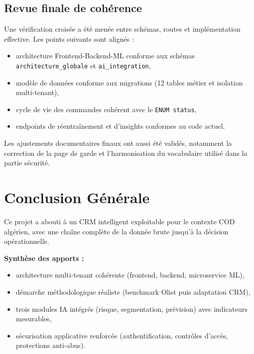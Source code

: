 \documentclass[12pt,a4paper]{report}
\begin{document}
\section{Revue finale de coh\'{e}rence}

Une v\'{e}rification crois\'{e}e a \'{e}t\'{e} men\'{e}e entre sch\'{e}mas, routes et impl\'{e}mentation effective. Les points suivants sont align\'{e}s :
\begin{itemize}
  \item architecture Frontend-Backend-ML conforme aux sch\'{e}mas \texttt{architecture\_globale} et \texttt{ai\_integration},
  \item mod\`{e}le de donn\'{e}es conforme aux migrations (12 tables m\'{e}tier et isolation multi-tenant),
  \item cycle de vie des commandes coh\'{e}rent avec le \texttt{ENUM status},
  \item endpoints de r\'{e}entra\^{i}nement et d'insights conformes au code actuel.
\end{itemize}

Les ajustements documentaires finaux ont aussi \'{e}t\'{e} valid\'{e}s, notamment la correction de la page de garde et l'harmonisation du vocabulaire utilis\'{e} dans la partie s\'{e}curit\'{e}.


\chapter*{Conclusion G\'{e}n\'{e}rale}

Ce projet a abouti \`{a} un CRM intelligent exploitable pour le contexte COD alg\'{e}rien, avec une cha\^{i}ne compl\`{e}te de la donn\'{e}e brute jusqu'\`{a} la d\'{e}cision op\'{e}rationnelle.

\textbf{Synth\`{e}se des apports :}
\begin{itemize}
  \item architecture multi-tenant coh\'{e}rente (frontend, backend, microservice ML),
  \item d\'{e}marche m\'{e}thodologique r\'{e}aliste (benchmark Olist puis adaptation CRM),
  \item trois modules IA int\'{e}gr\'{e}s (risque, segmentation, pr\'{e}vision) avec indicateurs mesurables,
  \item s\'{e}curisation applicative renforc\'{e}e (authentification, contr\^{o}les d'acc\`{e}s, protections anti-abus).
\end{itemize}
\end{document}

